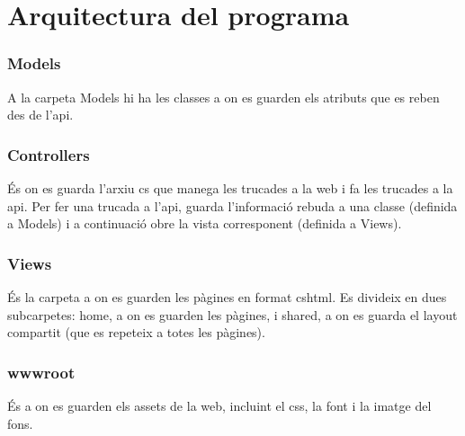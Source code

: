 \section{Arquitectura del programa}

\subsubsection{Models}
A la carpeta Models hi ha les classes a on es guarden
els atributs que es reben des de l'api.


\subsubsection{Controllers}
\'Es on es guarda l'arxiu cs que manega les trucades a la web i fa les trucades a la api.
Per fer una trucada a l'api,
guarda l'informaci\'o rebuda a una classe (definida a Models)
i a continuaci\'o obre la vista corresponent (definida a Views).

\subsubsection{Views}
\'Es la carpeta a on es guarden les p\`agines en format cshtml.
Es divideix en dues subcarpetes: home, a on es guarden les p\`agines,
i shared, a on es guarda el layout compartit (que es repeteix a totes les p\`agines).

\subsubsection{wwwroot}
\'Es a on es guarden els assets de la web,
incluint el css, la font i la imatge del fons.

